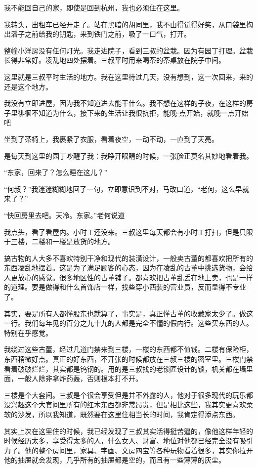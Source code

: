 我不能回自己的家，即使是回到杭州，我也必须住在这里。

我转头，出租车已经开走了。站在黑暗的胡同里，我不由得觉得好笑，从口袋里掏出潘子之前给我的钥匙，来到铁门之前，吸了一口气，打开。

整幢小洋房没有任何灯光。我走进院子，看到三叔的盆栽。因为有园丁打理。盆栽长得非常好。凌乱地四处摆着。三叔平时用来喝茶的茶桌放在院子中间。

这里就是三叔平时生活的地方。我在这里待过几天，没有想到，这一次回来，来的还是这个地方。

我没有立即进屋，因为我不知道进去能干什么。我不想在这样的子夜，在这样的房子里徘徊不知道为什么，接下来的生活让我很抗拒，能晚-点开始，就晚一点开始吧

坐到了茶椅上，我裹紧了衣服，看着夜空，一动不动，一直到了天亮。

是每天到这里的园丁吵醒了我：我睁开眼睛的时候，一张脸正莫名其妙地看着我。

“东家，回来了？怎么睡在这儿？”

“何叔？”我迷迷糊糊地回了一句，立即意识到不对，马改口道，“老何，这么早就来了？”

“快回房里去吧。天冷。东家。”老何说道

我点头，看了看屋内。小时工还没来。三叔这里每天都会有小时工打扫，但是只限于三楼，二楼和一楼是放货的地方。

搞古物的人大多不喜欢特别干净和现代的装潢设计，一般卖古董的都喜欢把所有的东西凌乱地摆着。这是为了满足顾客的心态，因为在凌乱的古董中挑选货物，会给人更放心的感觉。很多地区性的古董铺子。都喜欢把古董乱丢在地上卖，也是一样的道理。要是做得和什么首饰店一样，找些穿小西装的营业员，反而显得不专业了。

其实，要是所有人都懂股东也就算了，事实是，真正懂古董的收藏家太少了。做这一行。我们每年见的百分之九十九的人都是完全不懂的假内行。这些买东西的人。特别在乎感觉。

我绕过这些古董，经过几道门禁来到三楼，一楼的东西都不值钱。二楼有保险柜，东西稍微好点。真正的好东西，不开张的时候都放在三叔三楼的密室里。三楼门禁看着破破烂烂，其实都是钨钢的。用的是三叔找的老锁匠设计的锁，机关都在墙里面，一般人除非拿炸药轰，否则根本打不开。

三楼是个大套间。三叔是个很会享受但是并不外露的人，他对于很多现代的玩乐都没兴趣这个大套间里所有的红木东西都非常昂贵，但是相比这些，我其实更喜欢柔软的沙发，所以我知道，既然要在这里住相当长的时间，我肯定得添点东西。

其实上次在这里住的时候，我已经发现了三叔其实活得挺苦逼的，像他这样年轻的时候经历太多，享受得太多的人，什么女人、财富、地位对他都已经完全没有吸引力了。他的整个房间里，家具、字画、文房四宝等各种玩物看着很多，其实你拉开他的抽屉就会发现，几乎所有的抽屉都是空的，而且有一些薄薄的灰尘。

